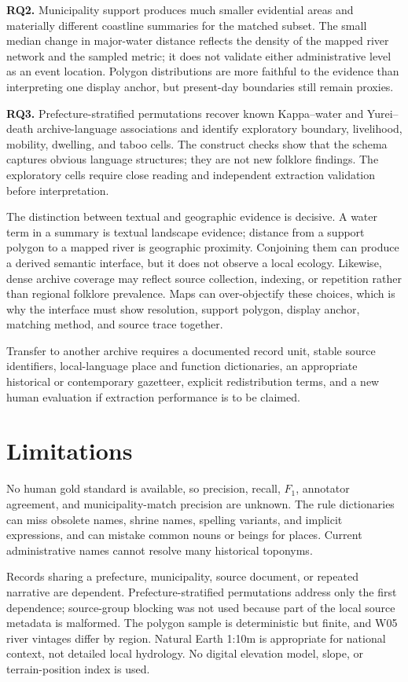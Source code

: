 \documentclass{isprs}
\begin{document}
\textbf{RQ2.} Municipality support produces much smaller evidential areas and materially different coastline summaries for the matched subset. The small median change in major-water distance reflects the density of the mapped river network and the sampled metric; it does not validate either administrative level as an event location. Polygon distributions are more faithful to the evidence than interpreting one display anchor, but present-day boundaries still remain proxies.

\textbf{RQ3.} Prefecture-stratified permutations recover known Kappa--water and Yurei--death archive-language associations and identify exploratory boundary, livelihood, mobility, dwelling, and taboo cells. The construct checks show that the schema captures obvious language structures; they are not new folklore findings. The exploratory cells require close reading and independent extraction validation before interpretation.

The distinction between textual and geographic evidence is decisive. A water term in a summary is textual landscape evidence; distance from a support polygon to a mapped river is geographic proximity. Conjoining them can produce a derived semantic interface, but it does not observe a local ecology. Likewise, dense archive coverage may reflect source collection, indexing, or repetition rather than regional folklore prevalence. Maps can over-objectify these choices, which is why the interface must show resolution, support polygon, display anchor, matching method, and source trace together.

Transfer to another archive requires a documented record unit, stable source identifiers, local-language place and function dictionaries, an appropriate historical or contemporary gazetteer, explicit redistribution terms, and a new human evaluation if extraction performance is to be claimed.

\section{Limitations}

No human gold standard is available, so precision, recall, \(F_1\), annotator agreement, and municipality-match precision are unknown. The rule dictionaries can miss obsolete names, shrine names, spelling variants, and implicit expressions, and can mistake common nouns or beings for places. Current administrative names cannot resolve many historical toponyms.

Records sharing a prefecture, municipality, source document, or repeated narrative are dependent. Prefecture-stratified permutations address only the first dependence; source-group blocking was not used because part of the local source metadata is malformed. The polygon sample is deterministic but finite, and W05 river vintages differ by region. Natural Earth 1:10m is appropriate for national context, not detailed local hydrology. No digital elevation model, slope, or terrain-position index is used.
\end{document}
